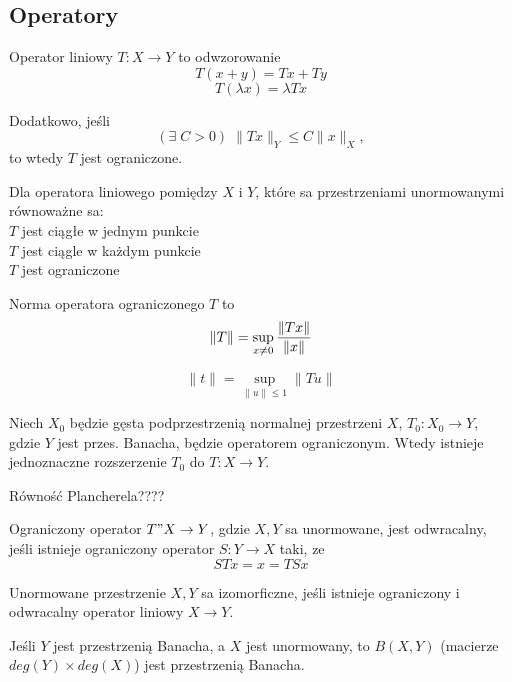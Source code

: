 \medskip


\subsection{Operatory}

\begin{multicols}{2}



    \pdef

        {\color{def}Operator liniowy} $T:X\to Y$ to odwzorowanie
        $$T(x+y) = Tx + Ty$$
        $$T(\lambda x)=\lambda Tx$$

        Dodatkowo, jeśli
        $$(\exists\;C>0)\;\|Tx\|_Y\leq C\|x\|_X,$$
        to wtedy $T$ jest {\color{def}ograniczone}.\\

    \kdef
    \bigskip

    Dla operatora liniowego pomiędzy $X$ i $Y$, które sa przestrzeniami unormowanymi {\color{acc}równoważne} sa:\smallskip\\
        \point $T$ jest ciągłe w jednym punkcie\\
        \point $T$ jest ciągle w każdym punkcie\\
        \point $T$ jest ograniczone
    \bigskip

    {\color{def}Norma operatora} ograniczonego $T$ to 
    $$\| T\|=\sup\limits_{x\neq0}{\|Tx\|\over\|x\|}$$

    \pdef

        $$\|t\|=\sup\limits_{\|u\|\leq 1}\|Tu\|$$

    \kdef
    \medskip

    \medskip

    Niech $X_0$ będzie gęsta podprzestrzenią normalnej przestrzeni $X$, $T_0:X_0\to Y$, gdzie $Y$ jest przes. Banacha, będzie operatorem ograniczonym. Wtedy istnieje jednoznaczne rozszerzenie $T_0$ do $T:X\to Y$.
    \medskip

    {\color{def}Równość Plancherela}{\color{cyan}????}
    \medskip

    Ograniczony operator $T"X\to Y$, gdzie $X,Y$ sa unormowane, jest {\color{def}odwracalny}, jeśli istnieje ograniczony operator $S:Y\to X$ taki, ze
    $$STx=x=TSx$$

    Unormowane przestrzenie $X,Y$ sa {\color{def}izomorficzne}, jeśli istnieje ograniczony i odwracalny operator liniowy $X\to Y$.
    \medskip

    Jeśli $Y$ jest przestrzenią Banacha, a $X$ jest unormowany, to $B(X, Y)$ (macierze $deg(Y)\times deg(X)$) jest przestrzenią Banacha.

\end{multicols}